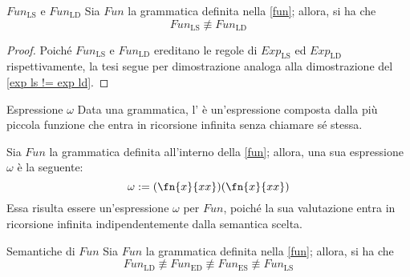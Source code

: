 \documentclass[a4paper, 12pt]{report}
\begin{document}
    \begin{framedlem}[label={fun lemma pt2}]{$Fun_\mathrm{LS}$ e $Fun_\mathrm{LD}$}
        Sia $Fun$ la grammatica definita nella \cref{fun}; allora, si ha che $$Fun_\mathrm{LS} \not\equiv Fun_\mathrm{LD}$$
    \end{framedlem}

    \begin{proof}
        Poiché $Fun_\mathrm{LS}$ e $Fun_\mathrm{LD}$ ereditano le regole di $Exp_\mathrm{LS}$ ed $Exp_\mathrm{LD}$ rispettivamente, la tesi segue per dimostrazione analoga alla dimostrazione del \cref{exp ls != exp ld}.
    \end{proof}

    \begin{frameddefn}[label={omega}]{Espressione $\omega$}
        Data una grammatica, l' è un'espressione composta dalla più piccola funzione che entra in ricorsione infinita senza chiamare sé stessa.
    \end{frameddefn}

    \begin{example}
        \label{omega fun}
        Sia $Fun$ la grammatica definita all'interno della \cref{fun}; allora, una sua espressione $\omega$ è la seguente: $$\omega := (\fn{x}{xx})(\fn{x}{xx})$$ Essa risulta essere un'espressione $\omega$ per $Fun$, poiché la sua valutazione entra in ricorsione infinita indipendentemente dalla semantica scelta.
    \end{example}

    \begin{framedlem}{Semantiche di $Fun$}
        Sia $Fun$ la grammatica definita nella \cref{fun}; allora, si ha che $$Fun_\mathrm{LD} \not\equiv Fun_\mathrm{ED} \not\equiv Fun_\mathrm{ES} \not\equiv Fun_\mathrm{LS}$$
    \end{framedlem}
    
\end{document}
